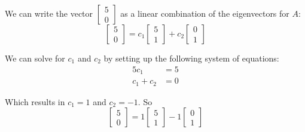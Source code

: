 We can write the vector $\begin{bmatrix}5\\0\end{bmatrix}$ as a linear combination of the eigenvectors for $A$:
\[
	\begin{bmatrix}5\\0\end{bmatrix} = c_1\begin{bmatrix}5\\1\end{bmatrix} + c_2\begin{bmatrix}0\\1\end{bmatrix}
\]

We can solve for $c_1$ and $c_2$ by setting up the following system of equations:
\begin{align*}
	5c_1      & = 5 \\
	c_1 + c_2 & = 0
\end{align*}

Which results in $c_1 = 1$ and $c_2 = -1$. So
\[
	\begin{bmatrix}5\\0\end{bmatrix} = 1\begin{bmatrix}5\\1\end{bmatrix} - 1\begin{bmatrix}0\\1\end{bmatrix}
\]

